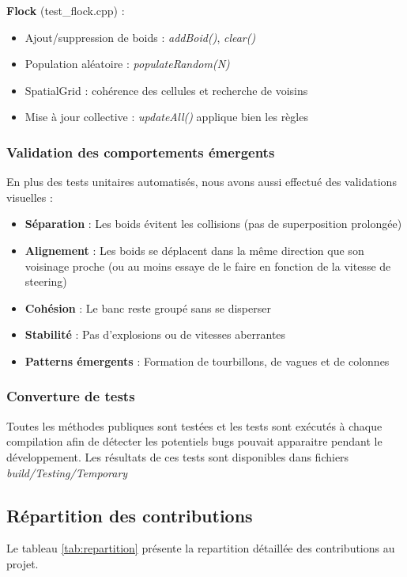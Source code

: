 \documentclass[11pt,a4paper]{article}
\begin{document}
\textbf{Flock} (test\_flock.cpp) :
\begin{itemize}
    \item Ajout/suppression de boids : \textit{addBoid()}, \textit{clear()}
    \item Population aléatoire : \textit{populateRandom(N)}
    \item SpatialGrid : cohérence des cellules et recherche de voisins 
    \item Mise à jour collective : \textit{updateAll()} applique bien les règles 
\end{itemize}

\subsubsection{Validation des comportements émergents}
En plus des tests unitaires automatisés, nous avons aussi effectué des validations visuelles :

\begin{itemize}
    \item \textbf{Séparation} : Les boids évitent les collisions (pas de superposition prolongée)
    \item \textbf{Alignement} : Les boids se déplacent dans la même direction que son voisinage proche (ou au moins essaye de le faire en fonction de la vitesse de steering)
    \item \textbf{Cohésion} : Le banc reste groupé sans se disperser
    \item \textbf{Stabilité} : Pas d'explosions ou de vitesses aberrantes
    \item \textbf{Patterns émergents} : Formation de tourbillons, de vagues et de colonnes
\end{itemize}

\subsubsection{Converture de tests}
Toutes les méthodes publiques sont testées et les tests sont exécutés à chaque compilation afin de détecter les potentiels bugs pouvait apparaitre pendant le développement. Les résultats de ces tests sont disponibles dans fichiers \textit{build/Testing/Temporary}

\subsection{Répartition des contributions}

Le tableau \ref{tab:repartition} présente la repartition détaillée des contributions au projet.
\end{document}
